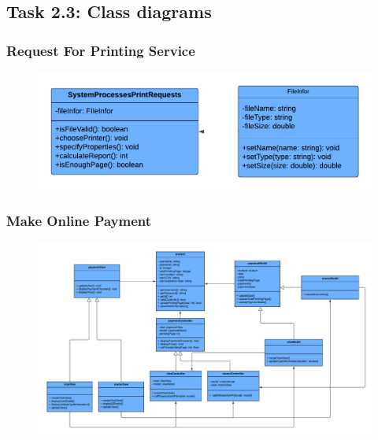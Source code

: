 \newpage
    \subsection{Task 2.3: Class diagrams}
    \subsubsection{Request For Printing Service}
    \begin{center}
    \begin{figure}[!htp]
    \begin{center}
     \includegraphics[scale=.9]{images/Task2/ClassDiagrams/RequestForPrintingService.png}
    \end{center}
    \label{refhinh1}
    \end{figure}
    \end{center}


    \subsubsection{Make Online Payment}
    \begin{center}
    \begin{figure}[!htp]
    \begin{center}
     \includegraphics[scale=.5]{images/Task2/ClassDiagrams/PaymentClass.pdf}
    \end{center}
    \label{refhinh1}
    \end{figure}
    \end{center}



